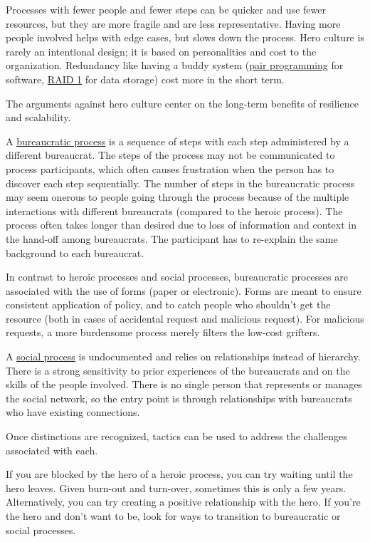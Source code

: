 Processes with fewer people and fewer steps can be quicker and use fewer resources, but they are more fragile and are less representative. Having more people involved helps with edge cases, but slows down the process.  Hero culture is rarely an intentional design; it is based on personalities and cost to the organization. Redundancy like having a buddy system (\href{https://en.wikipedia.org/wiki/Pair_programming}{pair programming} for software, \href{https://en.wikipedia.org/wiki/Standard_RAID_levels#RAID_1}{RAID 1} for data storage) cost more in the short term. 

The arguments against hero culture center on the long-term benefits of resilience and scalability.  

A \underline{bureaucratic process} is a sequence of steps with each step administered by a different bureaucrat. The steps of the process may not be communicated to process participants, which often causes frustration when the person has to discover each step sequentially. The number of steps in the bureaucratic process may seem onerous to people going through the process because of the multiple interactions with different bureaucrats (compared to the heroic process). The process often takes longer than desired due to loss of information and context in the hand-off among bureaucrats. The participant has to re-explain the same background to each bureaucrat.

In contrast to heroic processes and social processes, bureaucratic processes are associated with the use of forms (paper or electronic). 
Forms are meant to ensure consistent application of policy, and to catch people who shouldn't get the resource (both in cases of accidental request and malicious request). For malicious requests, a more burdensome process merely filters the low-cost grifters. 


A \underline{social process} is undocumented and relies on relationships instead of hierarchy. There is a strong sensitivity to prior experiences of the bureaucrats and on the skills of the people involved. There is no single person that represents or manages the social network, so the entry point is through relationships with bureaucrats who have existing connections.

Once distinctions are recognized, tactics can be used to address the challenges associated with each.

If you are blocked by the hero of a heroic process, you can try waiting until the hero leaves. Given burn-out and turn-over, sometimes this is only a few years. Alternatively, you can try creating a positive relationship with the hero.  If you're the hero and don't want to be, look for ways to transition to bureaucratic or social processes. 


